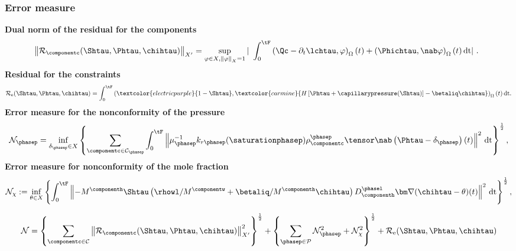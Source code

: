 \documentclass[10 pt]{beamer}
\begin{document}
\begin{frame}
\frametitle{Error measure}
\vspace{-0.2  cm}
\textcolor{cadmiumgreen}{\textbf{Dual norm of the residual for the components}}
\vspace{-0.15 cm}
\begin{equation*}
\hspace{-0.2 cm}\left\|\mathcal{R}_{\componentc}(\Shtau,\Phtau,\chihtau) \right\|_{X'} = \sup_{\varphi \in X, \left\|\varphi\right\|_X = 1} |\ \int_{0}^{\tF} 
\left(\Qc - \partial_t \lchtau , \varphi\right)_{\Omega}(t) + \left(\Phichtau,\nab \varphi \right)_{\Omega}(t)\,\mathrm{dt}|\ .
\vspace{-0.25 cm}
\end{equation*}
\textcolor{cadmiumgreen}{\textbf{Residual for the constraints}}
\begin{equation*}
  \mathcal{R}_{\mathrm{e}}(\Shtau,\Phtau,\chihtau) = \int_{0}^{\tF}\left(\textcolor{electricpurple}{1 - \Shtau}, \textcolor{carmine}{H \left[\Phtau + \capillarypressure(\Shtau)\right] - \betaliq \chihtau} \right)_{\Omega}(t)\,\mathrm{dt}.
\end{equation*}
\vspace{-0.3 cm} 
\textcolor{cadmiumgreen}{\textbf{Error measure for the nonconformity of the pressure}}
\begin{equation*}
\mathcal{N}_{\phasep} = \inf_{\delta_{\phasep} \in X} 
\left\{
\sum_{\componentc \in \mathcal{C}_{\phasep}}
 \int_{0}^{\tF} \left\|\mu_{\phasep}^{-1}k_{r \phasep}(\saturationphasep) \rho_{\componentc}^{\phasep} \tensor \nab \left(\Phtau-\delta_{\phasep}\right)(t) \right\|^2 \,\mathrm{dt} 
\right\}^{\frac{1}{2}}, 
\vspace{-0.15 cm}
\end{equation*}
\vspace{-0.15 cm}
\textcolor{cadmiumgreen}{\textbf{Error measure for nonconformity of the mole fraction}}
\vspace{-0.2 cm}
\begin{equation*}
\mathcal{N}_{\chi}:=\inf_{\theta \in X} \left\{\int_{0}^{\tF} \left\|- M^{\componenth} \Shtau \left(\rhowl/M^{\componentw} + \betaliq /M^{\componenth} \chihtau \right) D_{\componenth}^{\phasel} {\bm \nabla}(\chihtau - \theta)(t)\right\|^2\,\mathrm{dt} \right\}^\frac{1}{2},
\vspace{-0.2 cm}
\end{equation*}
\begin{definition}
\vspace{-0.5 cm}
\begin{equation*}
\mathcal{N} = \left\{\sum_{\componentc \in\mathcal{C}} \left\|\mathcal{R}_{\componentc}(\Shtau,\Phtau,\chihtau) \right\|_{X'}^2 \right\}^{\frac{1}{2}} + \left\{\sum_{\phasep \in \mathcal{P}}\mathcal{N}_{\phasep}^2 + \mathcal{N}_{\chi}^2\right\}^{\frac{1}{2}} + \mathcal{R}_{\mathrm{e}}(\Shtau,\Phtau,\chihtau)
\label{eq:norm:aposteriori}
\end{equation*}
\end{definition}

\end{frame}
\end{document}
